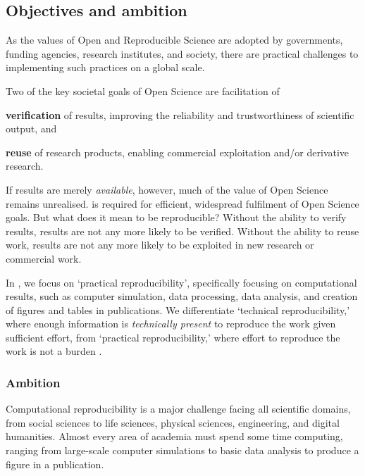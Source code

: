 \subsection{Objectives and ambition}

\label{sect:objectives}

As the values of Open and Reproducible Science are adopted by
governments, funding agencies, research institutes, and society,
there are practical challenges to implementing such practices on a global scale.

Two of the key societal goals of Open Science are facilitation of

\begin{compactenum}
\item \textbf{verification} of results, improving the reliability and trustworthiness of scientific output, and
\item \textbf{reuse} of research products, enabling commercial exploitation and/or derivative research.
\end{compactenum}

\noindent If results are merely \emph{available}, however,
much of the value of Open Science remains unrealised.
 is required for efficient, widespread fulfilment of Open Science goals.
But what does it mean to be reproducible?
Without the  ability to verify results, results are not
any more likely to be verified.
Without the  ability to reuse work, results are not
any more likely to be exploited in new research or commercial work.

In \TheProject, we focus on `practical reproducibility',
specifically focusing on computational results, such as computer simulation, data
processing, data analysis, and creation of figures and tables in publications.
We differentiate `technical reproducibility,'
where enough information is \emph{technically present} to reproduce the work given sufficient effort,
from `practical reproducibility,'
where effort to reproduce the work is not a burden \cite{binder}.

\subsubsection{Ambition}

Computational reproducibility is a major challenge facing all scientific domains,
from social sciences to life sciences, physical sciences, engineering, and digital humanities.
Almost every area of academia must spend some time computing,
ranging from large-scale computer simulations to basic data analysis to produce a figure in a publication.

